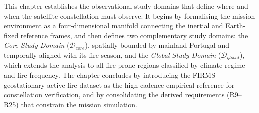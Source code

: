 






This chapter establishes the observational study domains that define where and when the satellite constellation must observe. It begins by formalising the mission environment as a four-dimensional manifold connecting the inertial and Earth-fixed reference frames, and then defines two complementary study domains: the \textit{Core Study Domain} ($\mathcal{D}_{core}$), spatially bounded by mainland Portugal and temporally aligned with its fire season, and the \textit{Global Study Domain} ($\mathcal{D}_{global}$), which extends the analysis to all fire-prone regions classified by climate regime and fire frequency. The chapter concludes by introducing the FIRMS geostationary active-fire dataset as the high-cadence empirical reference for constellation verification, and by consolidating the derived requirements (R9--R25) that constrain the mission simulation.

